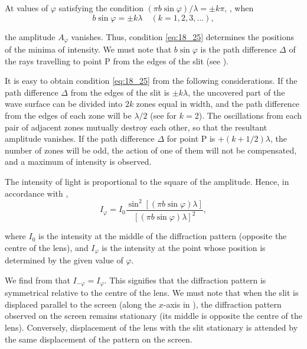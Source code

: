 At values of $\varphi$ satisfying the condition $(\pi b\sin\varphi)/\lambda=\pm k\pi$, \ie, when
\begin{equation}\label{eq:18_25}
	b \sin\varphi = \pm k \lambda \quad (k = 1, 2, 3, \ldots),
\end{equation}

\noindent
the amplitude $A_{\varphi}$ vanishes.
Thus, condition \eqref{eq:18_25} determines the positions of the minima of intensity.
We must note that $b\sin\varphi$ is the path difference $\Delta$ of the rays travelling to point P from the edges of the slit (see ).

It is easy to obtain condition \eqref{eq:18_25} from the following considerations.
If the path difference $\Delta$ from the edges of the slit is $\pm k\lambda$, the uncovered part of the wave surface can be divided into $2k$ zones equal in width, and the path difference from the edges of each zone will be $\lambda/2$ (see  for $k=2$).
The oscillations from each pair of adjacent zones mutually destroy each other, so that the resultant
amplitude vanishes.
If the path difference $\Delta$ for point P is $+(k+1/2)\lambda$, the number of zones will be odd, the action of one of them will not be compensated, and a maximum of intensity is observed.

The intensity of light is proportional to the square of the amplitude.
Hence, in accordance with ,
\begin{equation}\label{eq:18_26}
	I_{\varphi} = I_0 \frac{\sin^2[(\pi b \sin\varphi)\lambda]}{[(\pi b \sin\varphi)\lambda]^2},
\end{equation}

\noindent
where $I_0$ is the intensity at the middle of the diffraction pattern (opposite the centre of the lens), and $I_{\varphi}$ is the intensity at the point whose position is determined by the given value of $\varphi$.

We find from  that $I_{-\varphi}=I_{\varphi}$.
This signifies that the diffraction pattern is symmetrical relative to the centre of the lens.
We must note that when the slit is displaced parallel to the screen (along the $x$-axis in ), the diffraction pattern observed on the screen remains stationary (its middle is  opposite the centre of the lens).
Conversely, displacement of the lens with the slit stationary is attended by the same displacement of the pattern on the screen.

